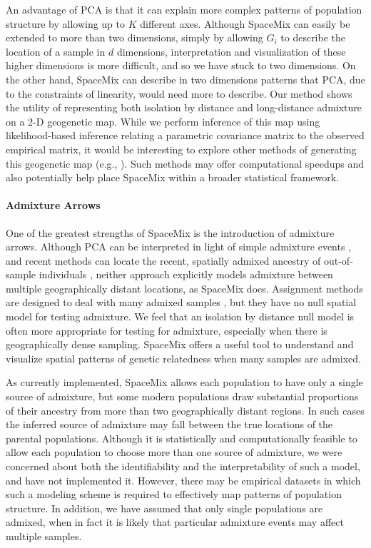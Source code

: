 \documentclass[10pt,letterpaper]{article}
\begin{document}
An advantage of PCA is that it can explain more complex patterns of population structure by allowing up to $K$ different axes.
Although SpaceMix can easily be extended to more than two dimensions, 
simply by allowing $G_i$ to describe the location of a sample in $d$ dimensions, 
interpretation and visualization of these higher dimensions is more difficult,
and so we have stuck to two dimensions.
On the other hand, SpaceMix can describe in two dimensions patterns that PCA,
due to the constraints of linearity, would need more to describe.
Our method shows the utility of representing both isolation by distance and 
long-distance admixture on a 2-D geogenetic map.  
While we perform inference of this map using likelihood-based inference 
relating a parametric covariance matrix to the observed empirical matrix, 
it would be interesting to explore other methods of generating this geogenetic map 
(e.g., \cite{Bookstein_1989,Sampson_Guttorp_1992,yang_model-based_2012,Petkova_2014_EEMS}).  
Such methods may offer computational speedups 
and also potentially help place SpaceMix within a broader statistical framework.

\paragraph{Admixture Arrows}
One of the greatest strengths of SpaceMix is the introduction of admixture arrows. 
Although PCA can be interpreted in light of simple admixture events \cite{mcvean_genealogical_2009}, 
and recent methods can locate the recent, spatially admixed ancestry of out-of-sample individuals \cite{yang_model-based_2012,yang_spatial_2014},
neither approach explicitly models admixture between multiple geographically distant locations,
as SpaceMix does.
Assignment methods are designed to deal with many admixed samples \cite{STRUCTURE}, 
but they have no null spatial model for testing admixture.
We feel that an isolation by distance null model is often more appropriate for testing for admixture, 
especially when there is geographically dense sampling. 
SpaceMix offers a useful tool to understand and visualize spatial patterns of genetic relatedness when many samples are admixed. 

As currently implemented, SpaceMix allows each population to have only a single source of admixture, 
but some modern populations draw substantial proportions of their ancestry from more than two geographically distant regions.
In such cases the inferred source of admixture may fall between the true locations of the parental populations.  
Although it is statistically and computationally feasible to allow each population to choose more than one source of admixture, 
we were concerned about both the identifiability and the interpretability of such a model, and have not implemented it.
However, there may be empirical datasets in which such a modeling scheme is required to effectively map patterns of population structure.
In addition, we have assumed that only single populations are admixed, when in fact it is likely that particular admixture events may affect multiple samples.
\end{document}
